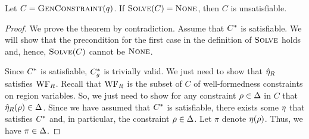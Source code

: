 \begin{theorem}
\label{thm:constraint-solver-completeness}
Let $C = \textsc{GenConstraint}(q)$.
If $\textsc{Solve}(C) = \textsc{None}$, then $C$ is unsatisfiable.
\end{theorem}

\begin{proof}
We prove the theorem by contradiction.
Assume that ${C}^*$ is satisfiable.
We will show that the precondition for the first case in the definition of $\textsc{Solve}$
holds and, hence, $\textsc{Solve}(C)$ cannot be $\textsc{None}$.

Since ${C}^*$ is satisfiable, ${C}^*_g$ is trivially valid.
We just need to show that $\hat{\eta}_R$ satisfies $\text{WF}_R$.
Recall that $\text{WF}_R$ is the subset of $C$ of well-formedness constraints
on region variables.
So, we just need to show for any constraint $\rho \in \Delta$ in $C$ that
$\hat{\eta}_R(\rho) \in \Delta$.
Since we have assumed that ${C}^*$ is satisfiable, there exists some $\eta$ that satisfies ${C}^*$
and, in particular, the constraint $\rho \in \Delta$.
Let $\pi$ denote $\eta(\rho)$. Thus, we have $\pi \in \Delta$.


\end{proof}
